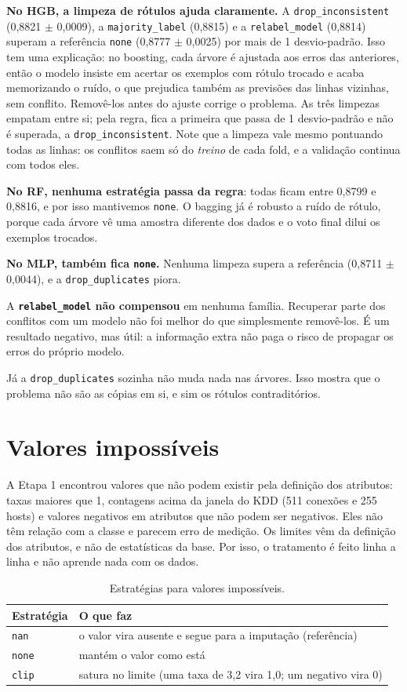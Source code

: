 \documentclass[11pt,a4paper]{article}
\begin{document}
\textbf{No HGB, a limpeza de rótulos ajuda claramente.} A \texttt{drop\_inconsistent} (0,8821 $\pm$ 0,0009), a \texttt{majority\_label} (0,8815) e a \texttt{relabel\_model} (0,8814) superam a referência \texttt{none} (0,8777 $\pm$ 0,0025) por mais de 1 desvio-padrão. Isso tem uma explicação: no boosting, cada árvore é ajustada aos erros das anteriores, então o modelo insiste em acertar os exemplos com rótulo trocado e acaba memorizando o ruído, o que prejudica também as previsões das linhas vizinhas, sem conflito. Removê-los antes do ajuste corrige o problema. As três limpezas empatam entre si; pela regra, fica a primeira que passa de 1 desvio-padrão e não é superada, a \texttt{drop\_inconsistent}. Note que a limpeza vale mesmo pontuando todas as linhas: os conflitos saem só do \emph{treino} de cada fold, e a validação continua com todos eles.

\textbf{No RF, nenhuma estratégia passa da regra}: todas ficam entre 0,8799 e 0,8816, e por isso mantivemos \texttt{none}. O bagging já é robusto a ruído de rótulo, porque cada árvore vê uma amostra diferente dos dados e o voto final dilui os exemplos trocados.

\textbf{No MLP, também fica \texttt{none}.} Nenhuma limpeza supera a referência (0,8711 $\pm$ 0,0044), e a \texttt{drop\_duplicates} piora.

A \textbf{\texttt{relabel\_model} não compensou} em nenhuma família. Recuperar parte dos conflitos com um modelo não foi melhor do que simplesmente removê-los. É um resultado negativo, mas útil: a informação extra não paga o risco de propagar os erros do próprio modelo.

Já a \texttt{drop\_duplicates} sozinha não muda nada nas árvores. Isso mostra que o problema não são as cópias em si, e sim os rótulos contraditórios.

\section{Valores impossíveis}

A Etapa 1 encontrou valores que não podem existir pela definição dos atributos: taxas maiores que 1, contagens acima da janela do KDD (511 conexões e 255 hosts) e valores negativos em atributos que não podem ser negativos. Eles não têm relação com a classe e parecem erro de medição. Os limites vêm da definição dos atributos, e não de estatísticas da base. Por isso, o tratamento é feito linha a linha e não aprende nada com os dados.

\begin{table}[H]
\centering
\caption{Estratégias para valores impossíveis.}
\begin{tabular}{lp{11cm}}
\toprule
Estratégia & O que faz \\
\midrule
\texttt{nan} & o valor vira ausente e segue para a imputação (referência) \\
\texttt{none} & mantém o valor como está \\
\texttt{clip} & satura no limite (uma taxa de 3,2 vira 1,0; um negativo vira 0) \\
\bottomrule
\end{tabular}
\end{table}
\end{document}
